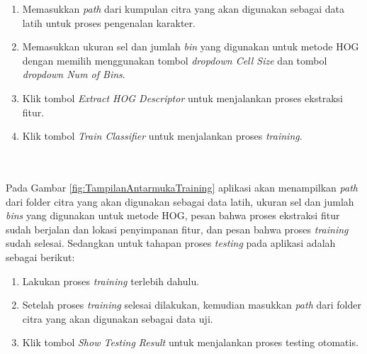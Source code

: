 \begin{enumerate}
\item Memasukkan \textit{path} dari kumpulan citra yang akan digunakan sebagai data latih untuk proses pengenalan karakter.
\item Memasukkan ukuran sel dan jumlah \textit{bin} yang digunakan untuk metode HOG dengan memilih menggunakan tombol \textit{dropdown Cell Size} dan tombol \textit{dropdown Num of Bins}.
\item Klik tombol \textit{Extract HOG Descriptor} untuk menjalankan proses ekstraksi fitur.
\item Klik tombol \textit{Train Classifier} untuk menjalankan proses \textit{training}.
\end{enumerate}
\begin{adjustbox}{width=1\textwidth}
	\noindent\begin{minipage}{\linewidth}
		\centering{}
		\label{fig:TampilanAntarmukaTraining}
	\end{minipage}
\end{adjustbox}\\
\\
\noindent Pada Gambar \ref{fig:TampilanAntarmukaTraining} aplikasi akan menampilkan \textit{path} dari folder citra yang akan digunakan sebagai data latih, ukuran sel dan jumlah \textit{bins} yang digunakan untuk metode HOG, pesan bahwa proses ekstraksi fitur sudah berjalan dan lokasi penyimpanan fitur, dan pesan bahwa proses \textit{training} sudah selesai.
\noindent Sedangkan untuk tahapan proses \textit{testing} pada aplikasi adalah sebagai berikut:
\begin{enumerate}
\item Lakukan proses \textit{training} terlebih dahulu.
\item Setelah proses \textit{training} selesai dilakukan, kemudian masukkan \textit{path} dari folder citra yang akan digunakan sebagai data uji.
\item Klik tombol \textit{Show Testing Result} untuk menjalankan proses testing otomatis.
\end{enumerate}
